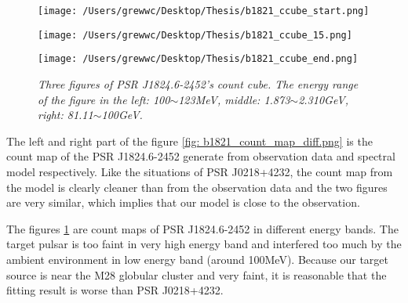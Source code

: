 \documentclass[12pt]{report}
\newcommand{\mycaption}[1]{\caption{\textit{\footnotesize #1}}}
\begin{document}
              \begin{figure}[!ht]
                \begin{center}
                \begin{minipage}{0.32\textwidth}
                  \begin{center} 
                    \texttt{[image: /Users/grewwc/Desktop/Thesis/b1821\_ccube\_start.png]}
                  \end{center}
                \end{minipage}
                \begin{minipage}{0.32\textwidth}
                  \begin{center}
                    \texttt{[image: /Users/grewwc/Desktop/Thesis/b1821\_ccube\_15.png]}
                  \end{center}
                \end{minipage}
                \begin{minipage}{0.32\textwidth}
                  \begin{center}
                  \texttt{[image: /Users/grewwc/Desktop/Thesis/b1821\_ccube\_end.png]}
                  \end{center}
                \end{minipage}
              \end{center}
                \centering
                \begin{minipage}{0.8\textwidth}
                  \mycaption{Three figures of PSR J1824.6-2452's count cube. The energy range of the figure in the 
                    left: 100$\sim$123MeV, middle: 1.873$\sim$2.310GeV, right: 81.11$\sim$100GeV.}
                  \label{fig: b1821_ccube_1_15_33.png}
                \end{minipage}
              \end{figure}

              The left and right part of the figure \ref{fig: b1821_count_map_diff.png} is the count 
              map of the PSR J1824.6-2452 generate from observation data and spectral model respectively. 
              Like the situations of PSR J0218+4232, the count map from the model is clearly cleaner than 
              from the observation data and the two figures are very similar, which implies that our model 
              is close to the observation. 

              The figures \ref{fig: b1821_ccube_1_15_33.png} are count maps of PSR J1824.6-2452 in different energy 
              bands. The target pulsar is too faint in very high energy band and interfered too much by the ambient 
              environment in low energy band (around 100MeV). Because our target source is near the M28 globular 
              cluster and very faint, it is reasonable that the fitting result is worse than PSR J0218+4232. 
\end{document}
